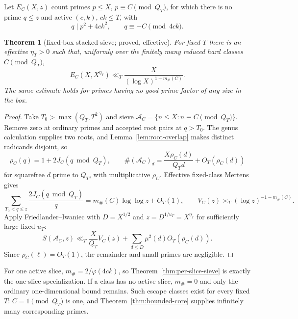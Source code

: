 \documentclass[10pt,reqno]{amsart}
\newtheorem{theorem}{Theorem}[section]
\theoremstyle{definition}
\newcommand{\1}{\mathbf 1}
\begin{document}
Let $E_C(X,z)$ count primes $p\leq X$, $p\equiv C\pmod {Q_T}$, for which
there is no prime $q\leq z$ and active $(c,k)$, $ck\leq T$, with
\begin{equation}\tag{53.8}
 q\mid p^2+4ck^2,\qquad q\equiv-C\pmod {4ck}.
\end{equation}
\begin{theorem}[fixed-box stacked sieve; proved, effective]
\label{thm:fixed-stack}
For fixed $T$ there is an effective $\eta_T>0$ such that, uniformly over
the finitely many reduced hard classes $C\pmod {Q_T}$,
\begin{equation}\tag{53.9}
                  E_C(X,X^{\eta_T})
                  \ll_T\frac X{(\log X)^{1+m_\#(C)}}.
\end{equation}
The same estimate holds for primes having no good prime factor of any size
in the box.
\end{theorem}
\begin{proof}
Take $T_0>\max(Q_T,T^2)$ and sieve
$\mathcal A_C=\{n\leq X:n\equiv C\pmod {Q_T}\}$.  Remove zero at ordinary
primes and accepted root pairs at $q>T_0$.  The genus calculation supplies
two roots, and Lemma~\ref{lem:root-overlap} makes distinct radicands
disjoint, so
\begin{equation}\tag{53.11--53.12}
 \rho_C(q)=1+2J_C(q\bmod Q_T),\qquad
 \#(\mathcal A_C)_d=\frac{X\rho_C(d)}{Q_Td}+O_T(\rho_C(d))
\end{equation}
for squarefree $d$ prime to $Q_T$, with multiplicative $\rho_C$.  Effective
fixed-class Mertens gives
\begin{equation}\tag{53.13--53.14}
 \sum_{T_0<q\leq z}\frac{2J_C(q\bmod Q_T)}q
 =m_\#(C)\log\log z+O_T(1),\qquad
 V_C(z)\asymp_T(\log z)^{-1-m_\#(C)}.
\end{equation}
Apply Friedlander--Iwaniec \cite[Theorem~6.9]{FriedlanderIwaniec} with
$D=X^{1/2}$ and $z=D^{1/u_T}=X^{\eta_T}$ for sufficiently large fixed
$u_T$:
\begin{equation}\tag{53.15}
 S(\mathcal A_C,z)\ll_T\frac X{Q_T}V_C(z)
 +\sum_{d\leq D}\mu^2(d)O_T(\rho_C(d)).
\end{equation}
Since $\rho_C(\ell)=O_T(1)$, the remainder and small primes are negligible.
\end{proof}
For one active slice, $m_\#=2/\varphi(4ck)$, so
Theorem~\ref{thm:per-slice-sieve} is exactly the one-slice specialization.
If a class has no active slice, $m_\#=0$ and only the ordinary
one-dimensional bound remains.  Such escape classes exist for every fixed
$T$: $C=1\pmod {Q_T}$ is one, and Theorem~\ref{thm:bounded-core} supplies
infinitely many corresponding primes.
\end{document}
